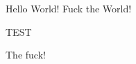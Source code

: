 \documentclass{article}
\begin{document}
Hello World! Fuck the World! 

TEST

The fuck! 
\end{document}
